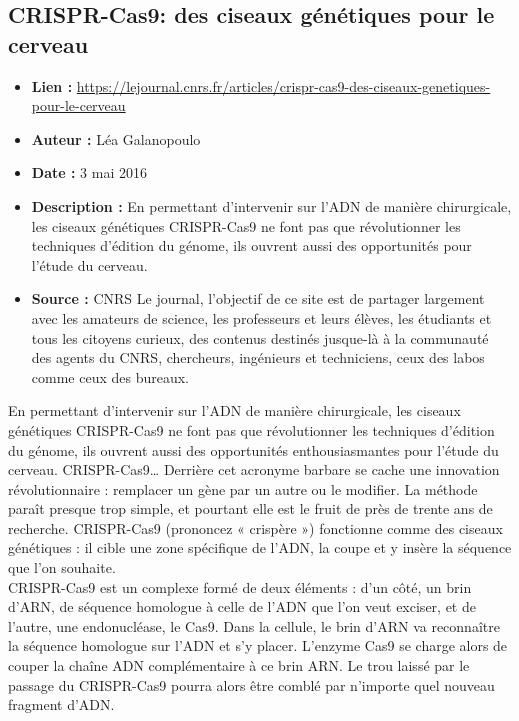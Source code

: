\documentclass[8pt]{article}
\begin{document}
\newpage
\subsection{CRISPR-Cas9: des ciseaux génétiques pour le cerveau}
 
\begin{itemize}
	\item \textbf{Lien : }  \url{https://lejournal.cnrs.fr/articles/crispr-cas9-des-ciseaux-genetiques-pour-le-cerveau} 
	\item \textbf{Auteur : } Léa Galanopoulo
	\item \textbf{Date : } 3 mai 2016
	\item \textbf{Description : } En permettant d’intervenir sur l’ADN de manière chirurgicale, les ciseaux génétiques CRISPR-Cas9 ne font pas que révolutionner les techniques d’édition du génome, ils ouvrent aussi des opportunités pour l’étude du cerveau.
	\item \textbf{Source : } CNRS Le journal, l'objectif de ce site est de partager largement avec les amateurs de science, les professeurs et leurs élèves, les étudiants et tous les citoyens curieux, des contenus destinés jusque-là à la communauté des agents du CNRS, chercheurs, ingénieurs et techniciens, ceux des labos comme ceux des bureaux.
\end{itemize}

En permettant d’intervenir sur l’ADN de manière chirurgicale, les ciseaux génétiques CRISPR-Cas9 ne font pas que révolutionner les techniques d’édition du génome, ils ouvrent aussi des opportunités enthousiasmantes pour l’étude du cerveau.
CRISPR-Cas9… Derrière cet acronyme barbare se cache une innovation révolutionnaire : remplacer un gène par un autre ou le modifier. La méthode paraît presque trop simple, et pourtant elle est le fruit de près de trente ans de recherche. CRISPR-Cas9 (prononcez « crispère ») fonctionne comme des ciseaux génétiques : il cible une zone spécifique de l’ADN, la coupe et y insère la séquence que l’on souhaite. \\

CRISPR-Cas9 est un complexe formé de deux éléments : d’un côté, un brin d’ARN, de séquence homologue à celle de l’ADN que l’on veut exciser, et de l’autre, une endonucléase, le Cas9. Dans la cellule, le brin d’ARN va reconnaître la séquence homologue sur l’ADN et s’y placer. L’enzyme Cas9 se charge alors de couper la chaîne ADN complémentaire à ce brin ARN. Le trou laissé par le passage du CRISPR-Cas9 pourra alors être comblé par n’importe quel nouveau fragment d’ADN.  \\
\end{document}
